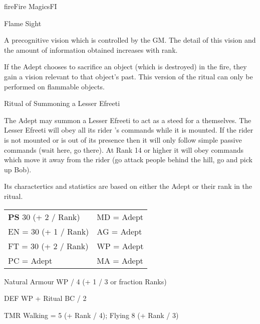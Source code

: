 \begin{college}[2.0]{fire}{Fire Magics}{FI}
\begin{ritual}[R-2]{Flame Sight}
\begin{effects}
\begin{Itemize}
\item
A precognitive vision which is controlled by the GM. The detail of
this vision and the amount of information obtained increases with
rank.

\item
If the Adept chooses to sacrifice an object (which is destroyed) in
the fire, they gain a vision relevant to that object's past. This
version of the ritual can only be performed on flammable objects.
\end{Itemize}
\end{effects}
\end{ritual}

\begin{ritual}[R-3]{Ritual of Summoning a Lesser Efreeti}
\begin{effects}
The Adept may summon a Lesser Efreeti to act as a steed for a
themselves. The Lesser Efreeti will obey all its rider 's commands
while it is mounted. If the rider is not mounted or is out of its
presence then it will only follow simple passive commands (\eg wait
here, go there).  At Rank 14 or higher it will obey commands which
move it away from the rider (\eg go attack people behind the hill, go
and pick up Bob).

Its charactertics and statistics are based on either the Adept or
their rank in the ritual.
\begin{center}
\begin{tabularx}{\linewidth}{XX}
{\bf PS} 30 (+ 2 / Rank) & MD = Adept \\
EN = 30 (+ 1 / Rank) & AG = Adept \\
FT = 30 (+ 2 / Rank) & WP = Adept \\
PC = Adept         & MA = Adept \\
\end{tabularx}
\end{center}

\begin{Description}
\item[Natural Armour] WP / 4 (+ 1 / 3 or fraction Ranks)

\item[DEF] WP + Ritual BC / 2

\item[TMR] Walking = 5 (+ Rank / 4); Flying 8 (+ Rank / 3)


\end{Description}
\end{effects}
\end{ritual}
\end{college}
